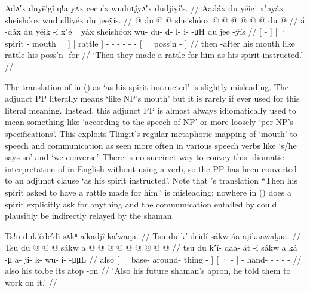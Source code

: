 \ex\label{ex:100-181-make-rattle}%
%
\begingl
	\glpreamble	Adᴀ′x duyē′gî q!a yᴀx cecu′x wuduʟ̣îyᴀ′x dudjiỵî′s. //
	\glpreamble	Aadáx̱ du yéigi x̱ʼayáx̱ sheishóox̱ wududliyéx̱ du jeeÿís. //
	\gla	{}  @ {} {}
		{} du  @ {}  @ {} {}
		{} sheishóox̱ {}
		 @ {} @ {} @ {} @ {} @ {} @ {}
		{} du  @ {} {} //
	\glb	{} á -dáx̱ {}
		{} du yéik -í x̱ʼé =yáx̱ {}
		{} sheishóox̱ {} 
		wu- du- d- l- i-  -μH
		{} du jee -ÿís {} //
	\glc	{}[  - {}]
		{}[ · spirit - mouth = {}]
		{}[ rattle {}]
		- - - - -  -
		{}[ · poss’n - {}] //
	\gld	{} then -after {} 
		{} his  {} mouth \•like {}
		{} rattle {}
		 {} {} {} {} {} {}
		{} his poss’n -for {} //
	\glft	‘Then they made a rattle for him as his spirit instructed.’
		//
\endgl
\xe

The translation of  in (\lastx) as ‘as his spirit instructed’ is slightly misleading.
The adjunct PP  literally means ‘like NP’s mouth’ but it is rarely if ever used for this literal meaning.
Instead, this adjunct PP is almost always idiomatically used to mean something like ‘according to the speech of NP’ or more loosely ‘per NP’s specifications’.
This exploits Tlingit’s regular metaphoric mapping of  ‘mouth’ to speech and communication as seen more often in various speech verbs like  ‘s/he says so’ and  ‘we converse’.
There is no succinct way to convey this idiomatic interpretation of  in English without using a verb, so the PP  has been converted to an adjunct clause ‘as his spirit instructed’.
Note that \citeauthor{swanton:1909}’s translation “Then his spirit asked to have a rattle made for him” is misleading; nowhere in (\lastx) does a spirit explicitly ask for anything and the communication entailed by  could plausibly be indirectly relayed by the shaman.

\ex\label{ex:100-182-future-apron}%
%
\begingl
	\glpreamble	Ts!u duk!êdē′dî sᴀkᵘ ā′kadjî kā′waqa. //
	\glpreamble	Tsu du kʼideidí sákw áa ajikaawaḵaa. //
	\gla	Tsu 
		{} du  @ {} @ {} @ {} sákw {} 
		{} a  @ {} {}
		 @ {} @ {} @ {} @ {} @ {} @ {} @ {} @ {} //
	\glb	tsu 
		{} du kʼí- daa- át -í sákw {} 
		{} a ká -μ {}
		a- ji- k- wu- i-  -μμL //
	\glc	also
		{}[ · base- around- thing -  {}]
		{}[ ·  - {}]
		- hand- - - -  - //
	\gld	also 
		{} his  {} {} {} to.be {}
		{} its atop -on {}
		 {} {} {} {} {} {} //
	\glft	‘Also his future shaman’s apron, he told them to work on it.’
		//
\endgl
\xe

